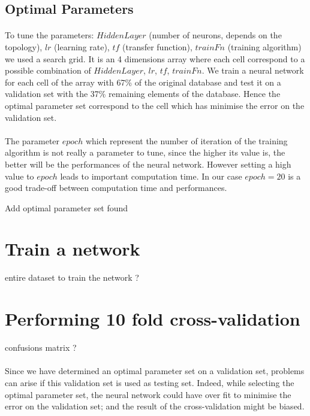 \documentclass[a4paper,12pt,oneside,final]{report}
\begin{document}
\subsection{Optimal Parameters}
\label{ch:opset}
\paragraph{}
To tune the parameters: $HiddenLayer$ (number of neurons, depends on the topology), $lr$ (learning rate), $tf$ (transfer function), $trainFn$ (training algorithm) we used a search grid. It is an 4 dimensions array where each cell correspond to a possible combination of $HiddenLayer$, $lr$, $tf$, $trainFn$. We train a neural network for each cell of the array with 67\% of the original database and test it on a validation set with the 37\% remaining elements of the database. Hence the optimal parameter set correspond to the cell which has minimise the error on the validation set.
\paragraph{}
The parameter $epoch$ which represent the number of iteration of the training algorithm is not really a parameter to tune, since the higher its value is, the better will be the performances of the neural network. However setting a high value to $epoch$ leads to important computation time. In our case $epoch=20$ is a good trade-off between computation time and performances.

{\color{red} Add optimal parameter set found}

\section{Train a network}
{\color{red} entire dataset to train the network ?}

\section{Performing 10 fold cross-validation}
{\color{red} confusions matrix ?}

\paragraph{}
Since we have determined an optimal parameter set on a validation set, problems can arise if this validation set is used as testing set. Indeed, while selecting the optimal parameter set, the neural network could have over fit to minimise the error on the validation set; and the result of the cross-validation might be biased.
\end{document}
